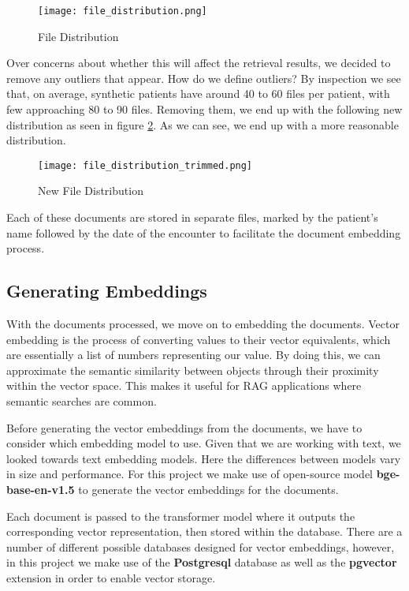 \begin{figure}[h]
	\centering
	\texttt{[image: file\_distribution.png]}
	\caption{File Distribution}
	\label{fig:FileDistribution}
\end{figure}

Over concerns about whether this will affect the retrieval results, we decided to remove any outliers that appear. How do we define outliers? By inspection we see that, on average, synthetic patients have around 40 to 60 files per patient, with few approaching 80 to 90 files.
Removing them, we end up with the following new distribution as seen in figure \ref{fig:FileDistributionAfter}. As we can see, we end up with a more reasonable distribution.

\begin{figure}[h]
	\centering
	\texttt{[image: file\_distribution\_trimmed.png]}
	\caption{New File Distribution}
	\label{fig:FileDistributionAfter}
\end{figure}

Each of these documents are stored in separate files, marked by the patient's name followed by the date of the encounter to facilitate the document embedding process.

\subsection{Generating Embeddings}

With the documents processed, we move on to embedding the documents. Vector embedding is the process of converting values to their vector equivalents, which are essentially a list of numbers representing our value.
By doing this, we can approximate the semantic similarity between objects through their proximity within the vector space. This makes it useful for RAG applications where semantic searches are common.

Before generating the vector embeddings from the documents, we have to consider which embedding model to use. Given that we are working with text, we looked towards text embedding models. Here the differences between models vary in size and performance. For this project we make use of open-source model \textbf{bge-base-en-v1.5} to generate the vector embeddings for the documents.

Each document is passed to the transformer model where it outputs the corresponding vector representation, then stored within the database. There are a number of different possible databases designed for vector embeddings, however, in this project we make use of the \textbf{Postgresql} database as well as the \textbf{pgvector} extension in order to enable vector storage.

